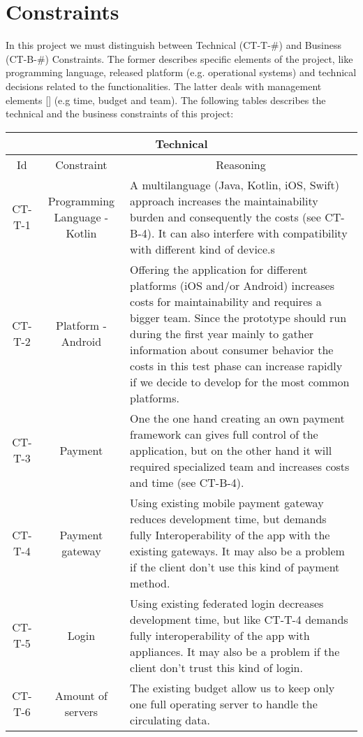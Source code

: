 \section{Constraints}

In this project we must distinguish between Technical (CT-T-\#) and Business (CT-B-\#) Constraints. The former describes specific elements
of the project, like programming language, released platform (e.g. operational systems) and technical decisions related to 
the functionalities. The latter deals with management elements [\cite{refonline:EFAD}] (e.g time, budget and team). The following
tables describes the technical and the business constraints of this project: 

\begin{table}[H]
    \begin{tabularx}{\textwidth}{|c|c|X|}
        \hline
        \multicolumn{3}{c}{\textbf{Technical}} \\
        \hline
        \toprule
        \multicolumn{1}{c}{Id} & \multicolumn{1}{c}{Constraint} & \multicolumn{1}{c}{Reasoning} \\
        \midrule
        CT-T-1 & Programming Language - Kotlin & A multilanguage (Java, Kotlin, iOS, Swift) approach increases
        the maintainability burden and consequently the costs (see CT-B-4). It can also interfere with
        compatibility with different kind of device.s  \\ 
        CT-T-2 & Platform - Android & Offering the application for different platforms (iOS and/or Android) increases
        costs for maintainability and requires a bigger team. Since the prototype should run during the
        first year mainly to gather information about consumer behavior the costs in this test phase can
        increase rapidly if we decide to develop for the most common platforms. \\ 
        CT-T-3 & Payment & One the one hand creating an own payment framework can gives full control of the application,
        but on the other hand it will required specialized team and increases costs and time (see CT-B-4). \\
        CT-T-4 & Payment gateway & Using existing \gls{mobile payment gateway} reduces development time, but demands
        fully Interoperability of the app with the existing gateways. It may also be a problem if the \gls{client}
        don't use this kind of payment method. \\
        CT-T-5 & Login & Using existing \gls{federated login} decreases development time, but like CT-T-4 demands
        fully interoperability of the app with appliances. It may also be a problem if the \gls{client}
        don't trust this kind of login. \\
        CT-T-6 & Amount of servers & The existing budget allow us to keep only one full operating server to handle
        the circulating data. \\
        \bottomrule
    \end{tabularx}
\end{table}

